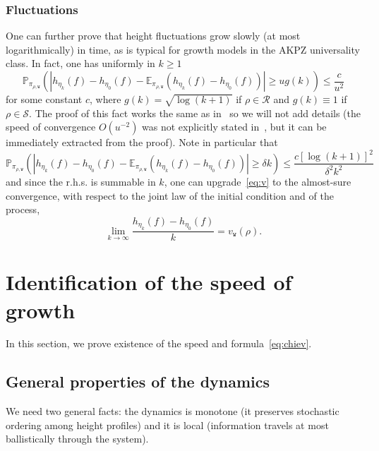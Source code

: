 \documentclass[10pt]{amsart}
\theoremstyle{definition}\newtheorem{defi}[theo]{Definition}\newtheorem{rema}[theo]{Remark}\newtheorem{exam}[theo]{Example}\newtheorem{exem}[theo]{Example}\newtheorem{nota}[theo]{Notation}
\newcommand{\ttw}{\mathtt{w}}
\newcommand{\bbE}{\mathbb{E}}
\newcommand{\bbP}{\mathbb{P}}
\newcommand{\clS}{\mathcal{S}}
\newcommand{\clR}{\mathcal{R}}
\begin{document}
\subsubsection{Fluctuations}\label{sec:fluct}
One can further prove that height fluctuations grow slowly (at most logarithmically) in time, as is typical for growth models in the AKPZ universality class. In fact, one has uniformly in $k\ge 1$
\[
\bbP_{\pi_{\rho,\ttw}}\left(\left|h_{\eta_k}(f)-h_{\eta_0}(f) -\bbE_{\pi_{\rho,\ttw}} \left(h_{\eta_k}(f)-h_{\eta_0}(f)\right)\right|\ge u g(k)\right)\le \frac{c}{u^2}
\]
for some constant $c$, where $g(k)=\sqrt{\log(k+1)}$ if $\rho\in\clR$ and $g(k)\equiv 1$ if $\rho\in\clS$. The proof of this fact works the same as in~\cite{CT:18} so we will not add details (the speed of convergence $O(u^{-2})$ was not explicitly stated in~\cite{CT:18}, but it can be immediately extracted from the proof). Note in particular that
\begin{equation}\label{eq:nip}
\bbP_{\pi_{\rho,\ttw}}\left(\left|h_{\eta_k}(f)-h_{\eta_0}(f) -\bbE_{\pi_{\rho,\ttw}} \left(h_{\eta_k}(f)-h_{\eta_0}(f)\right)\right|\ge \delta k\right)\le \frac{c [\log (k+1)]^2}{\delta^2k^2}
\end{equation}
and since the r.h.s. is summable in $k$, one can upgrade~\eqref{eq:v} to the almost-sure convergence, with respect to the joint law of the initial condition and of the process,
\begin{equation}\label{eq:asc}
\lim_{k\to\infty}\frac{h_{\eta_{k}}(f)-h_{\eta_{0}}(f)}k=v_{\ttw}(\rho).
\end{equation}


\section{Identification of the speed of growth} \label{sec:Identification}
\label{sec:proofs}


In this section, we prove existence of the speed and formula~\eqref{eq:chiev}.

\pagebreak
\subsection{General properties of the dynamics}\label{sec:Aztecodyn}

We need two general facts: the dynamics is monotone (it preserves stochastic ordering among height profiles) and it is local (information travels at most ballistically through the system).
\end{document}
